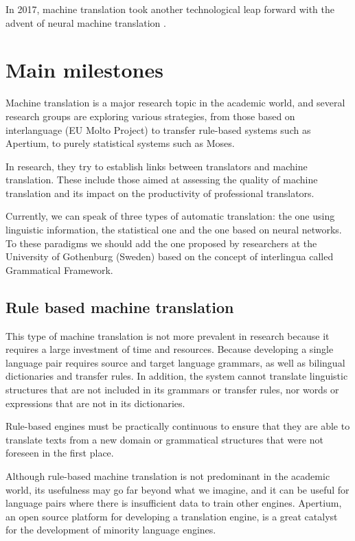 \documentclass[a4paper]{article}
\theoremstyle{plain}
\theoremstyle{definition}
\begin{document}
In 2017, machine translation took another technological leap forward with the advent of neural machine translation .


	
	
	
	
	
    \section{Main milestones}
	\label{sec:examples}
	Machine translation is a major research topic in the academic world, and several research groups are exploring various strategies, from those based on interlanguage (EU Molto Project) to transfer rule-based systems such as Apertium, to purely statistical systems such as Moses.

    In research, they try to establish links between translators and machine translation. These include those aimed at assessing the quality of machine translation and its impact on the productivity of professional translators.

    Currently, we can speak of three types of automatic translation: the one using linguistic information, the statistical one and the one based on neural networks. To these paradigms we should add the one proposed by researchers at the University of Gothenburg (Sweden) based on the concept of interlingua called Grammatical Framework.

    \subsection{Rule based machine translation}
    This type of machine translation is not more prevalent in research because it requires a large investment of time and resources. Because developing a single language pair requires source and target language grammars, as well as bilingual dictionaries and transfer rules. In addition, the system cannot translate linguistic structures that are not included in its grammars or transfer rules, nor words or expressions that are not in its dictionaries. 

    Rule-based engines must be practically continuous to ensure that they are able to translate texts from a new domain or grammatical structures that were not foreseen in the first place. 

    Although rule-based machine translation is not predominant in the academic world, its usefulness may go far beyond what we imagine, and it can be useful for language pairs where there is insufficient data to train other engines. Apertium, an open source platform for developing a translation engine, is a great catalyst for the development of minority language engines.
\end{document}
